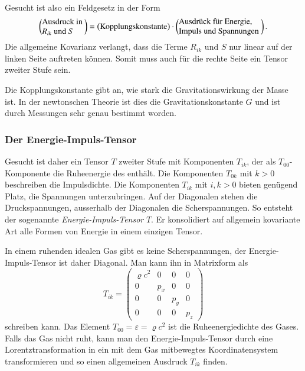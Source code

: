 Gesucht ist also ein Feldgesetz in der Form
\begin{equation}
\left(
\begin{minipage}{1.8cm}
\raggedright
Ausdruck in $R_{ik}$ und $S$
\end{minipage}
\right)
=
\left(
\text{Kopplungskonstante}
\right)
\cdot
\left(
\begin{minipage}{3.5cm}
\raggedright
Ausdrück für Energie, Impuls und Spannungen
\end{minipage}
\right).
\label{buch:kruemmung:feldgleichungen:eqn:schema}
\end{equation}
Die allgemeine Kovarianz verlangt, dass die Terme $R_{ik}$ und $S$
nur linear auf der linken Seite auftreten können.
Somit muss auch für die rechte Seite ein Tensor zweiter Stufe sein.

Die Kopplungskonstante gibt an, wie stark die Gravitationswirkung
der Masse ist. 
In der newtonschen Theorie ist dies die Gravitationskonstante $G$
und ist durch Messungen sehr genau bestimmt worden.

%
%
\subsubsection{Der Energie-Impuls-Tensor}
Gesucht ist daher ein Tensor $T$ zweiter Stufe mit Komponenten
$T_{ik}$, der als $T_{00}$-Kompo\-nen\-te die Ruheenergie des enthält.
Die Komponenten $T_{0k}$ mit $k>0$ beschreiben die Impulsdichte.
Die Komponenten $T_{ik}$ mit $i,k>0$ bieten genügend Platz, die
Spannungen unterzubringen.
Auf der Diagonalen stehen die Druckspannungen, ausserhalb der Diagonalen
die Scherspannungen.
So entsteht der sogenannte \emph{Energie-Impuls-Tensor} $T$.
Er konsolidiert auf allgemein kovariante Art alle Formen von Energie
in einem einzigen Tensor.

In einem ruhenden idealen Gas gibt es keine Scherspannungen,
der Energie-Impuls-Tensor ist daher Diagonal.
Man kann ihn in Matrixform als
\begin{equation}
T_{ik}
=
\begin{pmatrix}
\varrho     c^2 & 0             & 0             & 0             \\
0               & p_x           & 0             & 0             \\
0               & 0             & p_y           & 0             \\
0               & 0             & 0             & p_z
\end{pmatrix}
\label{buch:kruemmung:feldgleichung:eqn:Tik}
\end{equation}
schreiben kann.
Das Element $T_{00} = \varepsilon = \varrho c^2$ ist die
Ruheenergiedichte des Gases.
Falls das Gas nicht ruht, kann man den Energie-Impuls-Tensor durch
eine Lorentztransformation in ein mit dem Gas mitbewegtes
Koordinatensystem transformieren und so einen allgemeinen Ausdruck
$T_{ik}$ finden.

